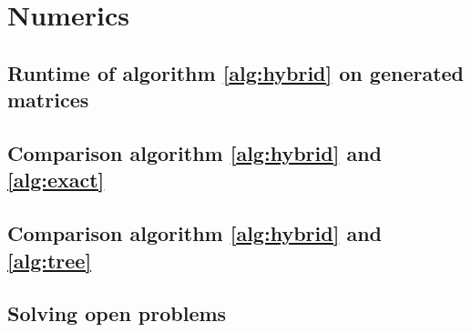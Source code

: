 
\chapter{Numerics} 
\label{ch:numerics}

\section{Runtime of algorithm \ref{alg:hybrid} on generated matrices}

\section{Comparison algorithm \ref{alg:hybrid} and \ref{alg:exact}}

\section{Comparison algorithm \ref{alg:hybrid} and \ref{alg:tree}}

\section{Solving open problems}